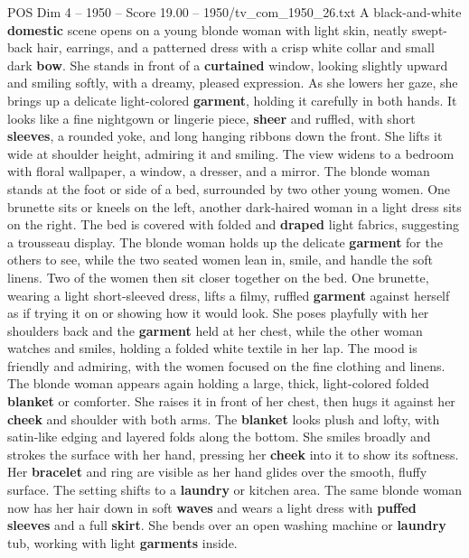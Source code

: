 \begin{textsample}{POS Dim 4 – 1950 – Score 19.00 – 1950/tv\_com\_1950\_26.txt}  \label{ex:f4_pos_032}
A black-and-white \textbf{domestic} scene opens on a young blonde woman with light skin, neatly swept-back hair, earrings, and a patterned dress with a crisp white collar and small dark \textbf{bow}.
She stands in front of a \textbf{curtained} window, looking slightly upward and smiling softly, with a dreamy, pleased expression.
As she lowers her gaze, she brings up a delicate light-colored \textbf{garment}, holding it carefully in both hands.
It looks like a fine nightgown or lingerie piece, \textbf{sheer} and ruffled, with short \textbf{sleeves}, a rounded yoke, and long hanging ribbons down the front.
She lifts it wide at shoulder height, admiring it and smiling.
The view widens to a bedroom with floral wallpaper, a window, a dresser, and a mirror.
The blonde woman stands at the foot or side of a bed, surrounded by two other young women.
One brunette sits or kneels on the left, another dark-haired woman in a light dress sits on the right.
The bed is covered with folded and \textbf{draped} light fabrics, suggesting a trousseau display.
The blonde woman holds up the delicate \textbf{garment} for the others to see, while the two seated women lean in, smile, and handle the soft linens.
Two of the women then sit closer together on the bed.
One brunette, wearing a light short-sleeved dress, lifts a filmy, ruffled \textbf{garment} against herself as if trying it on or showing how it would look.
She poses playfully with her shoulders back and the \textbf{garment} held at her chest, while the other woman watches and smiles, holding a folded white textile in her lap.
The mood is friendly and admiring, with the women focused on the fine clothing and linens.
The blonde woman appears again holding a large, thick, light-colored folded \textbf{blanket} or comforter.
She raises it in front of her chest, then hugs it against her \textbf{cheek} and shoulder with both arms.
The \textbf{blanket} looks plush and lofty, with satin-like edging and layered folds along the bottom.
She smiles broadly and strokes the surface with her hand, pressing her \textbf{cheek} into it to show its softness.
Her \textbf{bracelet} and ring are visible as her hand glides over the smooth, fluffy surface.
The setting shifts to a \textbf{laundry} or kitchen area.
The same blonde woman now has her hair down in soft \textbf{waves} and wears a light dress with \textbf{puffed} \textbf{sleeves} and a full \textbf{skirt}.
She bends over an open washing machine or \textbf{laundry} tub, working with light \textbf{garments} inside.

\end{textsample}
